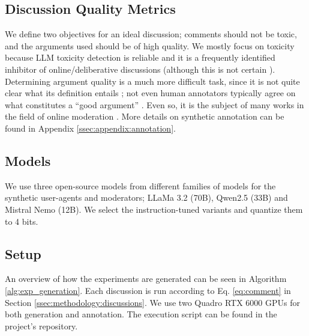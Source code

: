 \subsection{Discussion Quality Metrics}

We define two objectives for an ideal discussion; comments should not be toxic, and the arguments used should be of high quality. We mostly focus on toxicity because \ac{LLM} toxicity detection is reliable \citep{kang-qian-2024-implanting, Wang2022ToxicityDW, anjum2024hate} and it is a frequently identified inhibitor of online/deliberative discussions \citep{dekock2022disagree, XiaToxicity} (although this is not certain \citep{Avalle2024PersistentIP}). Determining argument quality is a much more difficult task, since it is not quite clear what its definition entails \cite{korre2025evaluation}; not even human annotators typically agree on what constitutes a “good argument” \cite{argyle2023}. Even so, it is the subject of many works in the field of online moderation \cite{argyle2023, schroeder-etal-2024-fora, falk-etal-2024-moderation, falk-etal-2021-predicting}. More details on synthetic annotation can be found in Appendix \ref{ssec:appendix:annotation}.


\subsection{Models}
\label{ssec:experimental:model}

We use three open-source models from different families of models for the synthetic user-agents and moderators; LLaMa 3.2 (70B), Qwen2.5 (33B) and Mistral Nemo (12B). We select the instruction-tuned variants and quantize them to 4 bits.


\subsection{Setup}

An overview of how the experiments are generated can be seen in Algorithm \ref{alg:exp_generation}. Each discussion is run according to Eq. \ref{eq:comment} in Section \ref{ssec:methodology:discussions}. We use two Quadro RTX 6000 GPUs for both generation and annotation. The execution script can be found in the project's repository\analysislink.

